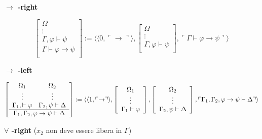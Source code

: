 \vspace{0.5cm}

\textbf{$\rightarrow$ -right}

$$
\left [
\begin{array}{c}
\Omega\\
\vdots\\
\Gamma, \varphi \vdash \psi\\
\hline
\Gamma \vdash \varphi \rightarrow \psi\\
\end{array}
\right ]
:= \langle \langle 0,\ulcorner \rightarrow \urcorner \rangle ,
\left [
\begin{array}{c}
\Omega\\
\vdots\\
\Gamma, \varphi \vdash \psi\\
\end{array}
\right ],
\ulcorner \Gamma \vdash \varphi \rightarrow \psi \urcorner \rangle
$$

\vspace{0.5cm}

\textbf{$\rightarrow$ -left}

{\tiny
$$
\left [
\begin{array}{cc}
\Omega_1 & \Omega_{2} \\
\vdots & \vdots\\
\Gamma_1, \vdash \varphi & \Gamma_2, \psi \vdash \Delta\\
\hline
\multicolumn{2}{c}{\Gamma_1, \Gamma_2, \varphi \rightarrow \psi \vdash \Delta}\\
\end{array}
\right ]
:= \langle \langle 1,\ulcorner \rightarrow \urcorner \rangle ,
\left [
\begin{array}{c}
\Omega_1\\
\vdots\\
\Gamma_1 \vdash \varphi\\
\end{array}
\right ],
\left [
\begin{array}{c}
\Omega_2\\
\vdots\\
\Gamma_2, \psi \vdash \Delta\\
\end{array}
\right],
\ulcorner \Gamma_1, \Gamma_2,  \varphi \rightarrow \psi \vdash \Delta \urcorner \rangle
$$}

\vspace{0.5cm}

\textbf{$\forall$ -right} ($x_2$ non deve essere libera in $\Gamma$)

